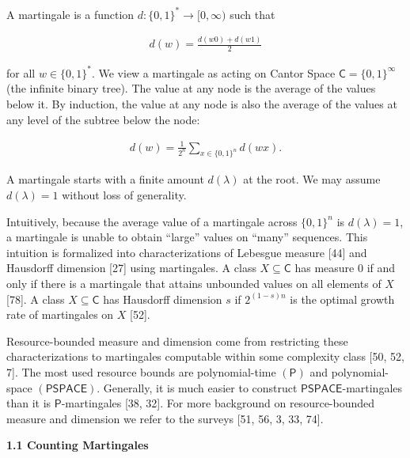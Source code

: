 \documentclass[10pt,a4paper]{article}
\begin{document}
A martingale is
a function $d:\{0,1\}^{*}\to[0,\infty)$ such that\par


\[\begin{gathered}
d(w)=\frac{d(w0)+d(w1)}{2}
\end{gathered}\]


for all $w\in\{0,1\}^{*}$.
We view a martingale as acting on Cantor Space $\mathsf{C}=\{0,1\}^{\infty}$ (the infinite binary tree). The value at any node is the average of the values below it. By induction, the value at any node is also the average of the values at any level of the subtree below the node:\par


\[\begin{gathered}
d(w)=\frac{1}{2^{n}}\sum_{x\in\{0,1\}^{n}}d(wx).
\end{gathered}\]


A martingale starts with a finite amount $d(\lambda)$ at the root. We may assume $d(\lambda)=1$ without loss of generality.\par




Intuitively, because the average value of a martingale across $\{0,1\}^{n}$ is $d(\lambda)=1$, a martingale is unable to obtain “large” values on “many” sequences. This intuition is formalized into characterizations of
Lebesgue measure [44] and Hausdorff dimension [27] using martingales. A class $X\subseteq\mathsf{C}$ has measure 0 if and only if there is a martingale that attains unbounded values on all elements of $X$ [78]. A class $X\subseteq\mathsf{C}$ has Hausdorff dimension $s$ if $2^{(1-s)n}$ is the optimal growth rate of martingales on $X$ [52].\par




Resource-bounded measure and dimension come from restricting these characterizations to martingales computable within some complexity class [50, 52, 7]. The most used resource bounds are polynomial-time $(\mathsf{P})$ and polynomial-space $(\mathsf{PSPACE})$.
Generally, it is much easier to construct $\mathsf{PSPACE}$-martingales than it is $\mathsf{P}$-martingales [38, 32]. For more background on resource-bounded measure and dimension we refer to the surveys [51, 56, 3, 33, 74].\par




\par\medskip\noindent\textbf{
1.1 Counting Martingales}\par
\end{document}
